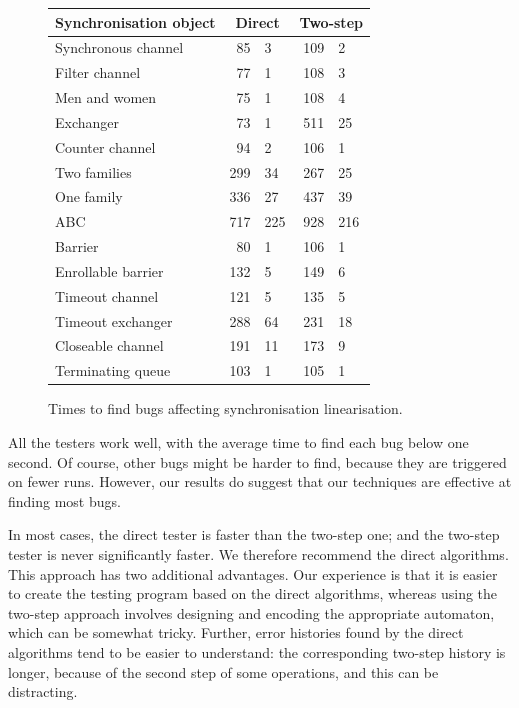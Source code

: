 \begin{figure}
\begin{center}
\begin{tabular}{lr@{$\,\pm\,$}lr@{$\,\pm\,$}l}
Synchronisation object & \multicolumn{2}{c}{Direct} &
\multicolumn{2}{c}{Two-step} \\ \hline
Synchronous channel  &	85 	 & 3 &  	109	 & 2 \\
Filter channel &        77       & 1 &          108      & 3 \\
Men and women  &	75	 & 1 &  	108	 & 4 \\
Exchanger  	&       73	 & 1 &  	511	 & 25 \\
Counter channel &  	94	 & 2 &  	106	 & 1 \\
Two families &  	299	 & 34 &  	267	 & 25 \\
One family &    	336	 & 27 &         437      & 39 \\
ABC &    	        717	 & 225 &  	928	 & 216 \\
Barrier &       	80	 & 1 &   	106	 & 1 \\
Enrollable barrier &  	132	 & 5 &  	149	 & 6 \\
Timeout channel  &	121	 & 5 &  	135	 & 5 \\
Timeout exchanger & 	288	 & 64 &  	231	 & 18 \\
Closeable channel & 	191	 & 11 &  	173	 & 9 \\
Terminating queue & 	103	 & 1 &  	105	 & 1
\end{tabular}
\end{center}
\caption{Times to find bugs affecting synchronisation linearisation.}
\label{fig:bugFindingExperiment}
\end{figure}


All the testers work well, with the average time to find each bug below one
second.  Of course, other bugs might be harder to find, because they are
triggered on fewer runs.  However, our results do suggest that our techniques
are effective at finding most bugs.

In most cases, the direct tester is faster than the two-step one; and the
two-step tester is never significantly faster.  We therefore recommend the
direct algorithms.  This approach has two additional advantages.  Our
experience is that it is easier to create the testing program based on the
direct algorithms, whereas using the two-step approach involves designing and
encoding the appropriate automaton, which can be somewhat tricky.  Further,
error histories found by the direct algorithms tend to be easier to
understand: the corresponding two-step history is longer, because of the
second step of some operations, and this can be distracting.

